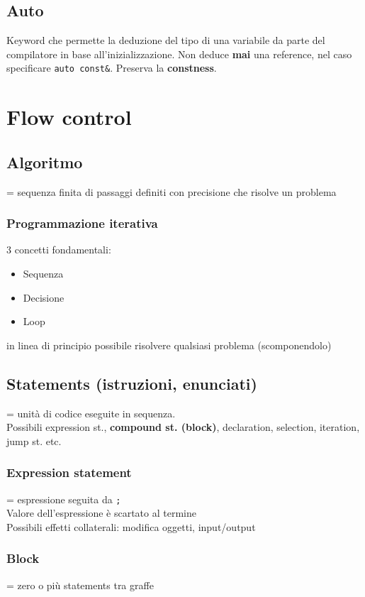 \documentclass[10pt, oneside]{book}
\begin{document}
\section{Auto}
Keyword che permette la deduzione del tipo di una variabile da parte del compilatore in base all'inizializzazione. Non deduce \textbf{mai} una reference, nel caso specificare \texttt{auto const\&}. Preserva la \textbf{constness}.

\chapter{Flow control}

\section{Algoritmo}
= sequenza finita di passaggi definiti con precisione che risolve un problema
\subsection{Programmazione iterativa}
3 concetti fondamentali:
\begin{itemize}
\item Sequenza
\item Decisione
\item Loop
\end{itemize}
in linea di principio possibile risolvere qualsiasi problema (scomponendolo)

\section{Statements (istruzioni, enunciati)}
= unità di codice eseguite in sequenza.\\
Possibili expression st., \textbf{compound st. (block)}, declaration, selection, iteration, jump st. etc.

\subsection{Expression statement}
= espressione seguita da \texttt{;}\\
Valore dell'espressione è scartato al termine\\
Possibili effetti collaterali: modifica oggetti, input/output

\subsection{Block}
= zero o più statements tra graffe
\end{document}
